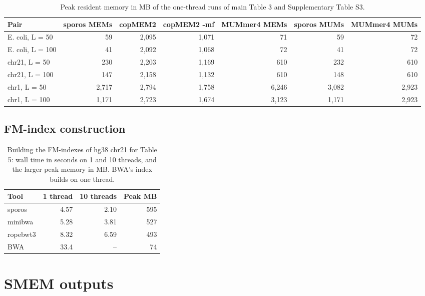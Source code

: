 \documentclass[10pt]{article}
\begin{document}
\begin{table}[H]
\caption{Peak resident memory in MB of the one-thread runs of main Table 3 and Supplementary Table S3.}\label{tab:memory}
\centering\footnotesize
\setlength{\tabcolsep}{4pt}
\begin{tabular}{@{}lrrrrrr@{}}
\toprule
Pair & sporos MEMs & copMEM2 & copMEM2 -mf & MUMmer4 MEMs & sporos MUMs & MUMmer4 MUMs \\
\midrule
E. coli, L = 50 & 59 & 2{,}095 & 1{,}071 & 71 & 59 & 72 \\
E. coli, L = 100 & 41 & 2{,}092 & 1{,}068 & 72 & 41 & 72 \\
chr21, L = 50 & 230 & 2{,}203 & 1{,}169 & 610 & 232 & 610 \\
chr21, L = 100 & 147 & 2{,}158 & 1{,}132 & 610 & 148 & 610 \\
chr1, L = 50 & 2{,}717 & 2{,}794 & 1{,}758 & 6{,}246 & 3{,}082 & 2{,}923 \\
chr1, L = 100 & 1{,}171 & 2{,}723 & 1{,}674 & 3{,}123 & 1{,}171 & 2{,}923 \\
\bottomrule
\end{tabular}
\end{table}

\subsection{FM-index construction}

\begin{table}[H]
\caption{Building the FM-indexes of hg38 chr21 for Table 5: wall time in seconds on 1 and 10 threads, and the larger peak memory in MB. BWA's index builds on one thread.}\label{tab:builds}
\centering\footnotesize
\setlength{\tabcolsep}{4pt}
\begin{tabular}{@{}lrrr@{}}
\toprule
Tool & 1 thread & 10 threads & Peak MB \\
\midrule
sporos & 4.57 & 2.10 & 595 \\
minibwa & 5.28 & 3.81 & 527 \\
ropebwt3 & 8.32 & 6.59 & 493 \\
BWA & 33.4 & -- & 74 \\
\bottomrule
\end{tabular}
\end{table}

\section{SMEM outputs}
\end{document}
